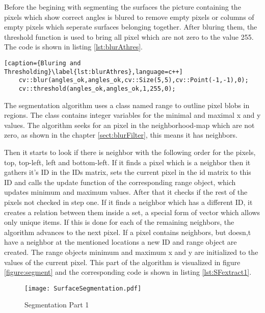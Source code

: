 Before the begining with segmenting the surfaces the picture containing the pixels which show correct angles
is blured to remove empty pixels or columns of empty pixels which seperate surfaces belonging together. After
bluring them, the threshold function is used to bring all pixel which are not zero to the value 255. The code is
shown in listing \vref{lst:blurAthres}.

\begin{lstlisting}[caption={Bluring and Thresholding}\label{lst:blurAthres},language=c++]
	cv::blur(angles_ok,angles_ok,cv::Size(5,5),cv::Point(-1,-1),0);
	cv::threshold(angles_ok,angles_ok,1,255,0);
\end{lstlisting}

The segmentation algorithm uses a class named range to outline pixel blobs in regions. The class contains integer 
variables for the minimal and maximal x and y values. The algorithm seeks for an pixel in the 
neighborhood-map which are not zero, as shown in the chapter \vref{sect:blurFilter}, this means it has neighbors. 

Then it starts to look if there is neighbor with the following order for the pixels, top, top-left, left and bottom-left.
If it finds a pixel which is a neighbor then it gathers it's ID in the IDs matrix, sets the current pixel in the
id matrix to this ID and calls the update function of the corresponding range object, which updates minimum and
maximum values. After that it checks if the rest of the pixels not checked in step one. If it finds a neighbor
which has a different ID, it creates a relation between them inside a set, a special form of vector which allows
only unique items. If this is done for each of the remaining neighbors, the algorithm advances to the next pixel. 
If a pixel contains neighbors, but doesn,t have a neighbor at the mentioned locations a new ID and range object are 
created. The range objects minimum and maximum x and y are initialized to the values of the current pixel.
This part of the algorithm is visualized in figure \vref{figure:segment} and the corresponding code is shown in listing
\vref{lst:SFextract1}.

\begin{figure}[htp]
\begin{center}
  \texttt{[image: SurfaceSegmentation.pdf]}
  \caption{Segmentation Part 1}
  \label{figure:segment}
\end{center}
\end{figure}

